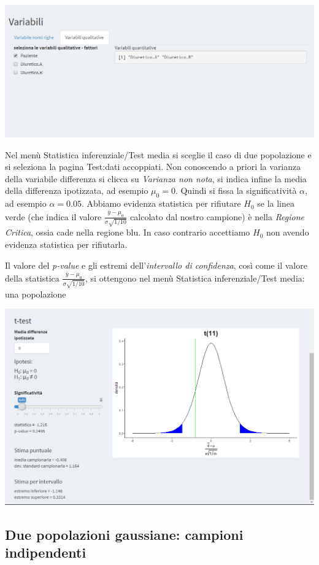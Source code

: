 \documentclass[
  11pt,
]{book}
\begin{document}
\begin{center}\includegraphics[width=0.5\linewidth]{Immagini/Inferenziale/variabili} \end{center}

Nel menù Statistica inferenziale/Test media si sceglie il caso di due popolazione e si seleziona la pagina Test:dati accoppiati. Non conoscendo a priori la varianza della variabile differenza si clicca su \emph{Varianza non nota}, si indica infine la media della differenza ipotizzata, ad esempio \(\mu_0=0\). Quindi si fissa la significatività \(\alpha\), ad esempio \(\alpha = 0.05\).
Abbiamo evidenza statistica per rifiutare \(H_0\) se la linea verde (che indica il valore \(\frac{\bar{y}-\mu_0}{\sigma\sqrt{1/10}}\) calcolato dal nostro campione) è nella \emph{Regione Critica}, ossia cade nella regione blu. In caso contrario accettiamo \(H_0\) non avendo evidenza statistica per rifiutarla.

Il valore del \emph{p-value} e gli estremi dell'\emph{intervallo di confidenza}, così come il valore della statistica \(\frac{\bar{y}-\mu_0}{\sigma\sqrt{1/10}}\), si ottengono nel menù Statistica inferenziale/Test media: una popolazione

\begin{center}\includegraphics[width=0.5\linewidth]{Immagini/Inferenziale/t_test_accoppiati} \end{center}

\hypertarget{due-popolazioni-gaussiane-campioni-indipendenti}{%
\subsection{Due popolazioni gaussiane: campioni indipendenti}\label{due-popolazioni-gaussiane-campioni-indipendenti}}
\end{document}
